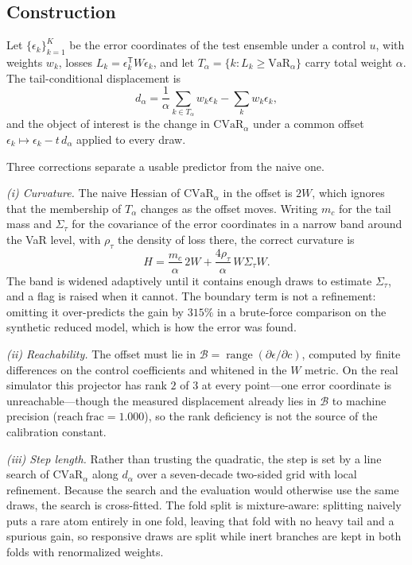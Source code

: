 \documentclass[aps,pra,onecolumn,notitlepage,superscriptaddress,nofootinbib,floatfix]{revtex4-2}
\newcommand{\cvar}{\mathrm{CVaR}}
\begin{document}
\subsection{Construction}

Let $\{\epsilon_k\}_{k=1}^{K}$ be the error coordinates of the test ensemble
under a control $u$, with weights $w_k$, losses
$L_k=\epsilon_k^{\mathsf T}W\epsilon_k$, and let
$T_\alpha=\{k: L_k\ge \mathrm{VaR}_\alpha\}$ carry total weight $\alpha$. The
tail-conditional displacement is
\begin{equation}
d_\alpha=\frac{1}{\alpha}\sum_{k\in T_\alpha} w_k\epsilon_k-\sum_k w_k\epsilon_k ,
\tag{S-disp}
\end{equation}
and the object of interest is the change in $\cvar_\alpha$ under a common
offset $\epsilon_k\mapsto\epsilon_k-t\,d_\alpha$ applied to every draw.

Three corrections separate a usable predictor from the naive one.

\emph{(i) Curvature.} The naive Hessian of $\cvar_\alpha$ in the offset is
$2W$, which ignores that the membership of $T_\alpha$ changes as the offset
moves. Writing $m_c$ for the tail mass and $\Sigma_\tau$ for the covariance
of the error coordinates in a narrow band around the VaR level, with
$\rho_\tau$ the density of loss there, the correct curvature is
\begin{equation}
H=\frac{m_c}{\alpha}\,2W+\frac{4\rho_\tau}{\alpha}\,W\Sigma_\tau W .
\tag{S-hess}
\end{equation}
The band is widened adaptively until it contains enough draws to estimate
$\Sigma_\tau$, and a flag is raised when it cannot. The boundary term is not
a refinement: omitting it over-predicts the gain by $315\%$ in a brute-force
comparison on the synthetic reduced model, which is how the error was found.

\emph{(ii) Reachability.} The offset must lie in
$\mathcal{B}=\operatorname{range}(\partial\epsilon/\partial c)$, computed by
finite differences on the control coefficients and whitened in the $W$
metric. On the real simulator this projector has rank $2$ of $3$ at every
point---one error coordinate is unreachable---though the measured
displacement already lies in $\mathcal{B}$ to machine precision
($\mathrm{reach\ frac}=1.000$), so the rank deficiency is not the source of
the calibration constant.

\emph{(iii) Step length.} Rather than trusting the quadratic, the step is set
by a line search of $\cvar_\alpha$ along $d_\alpha$ over a seven-decade
two-sided grid with local refinement. Because the search and the evaluation
would otherwise use the same draws, the search is cross-fitted. The fold
split is mixture-aware: splitting naively puts a rare atom entirely in one
fold, leaving that fold with no heavy tail and a spurious gain, so responsive
draws are split while inert branches are kept in both folds with renormalized
weights.
\end{document}
